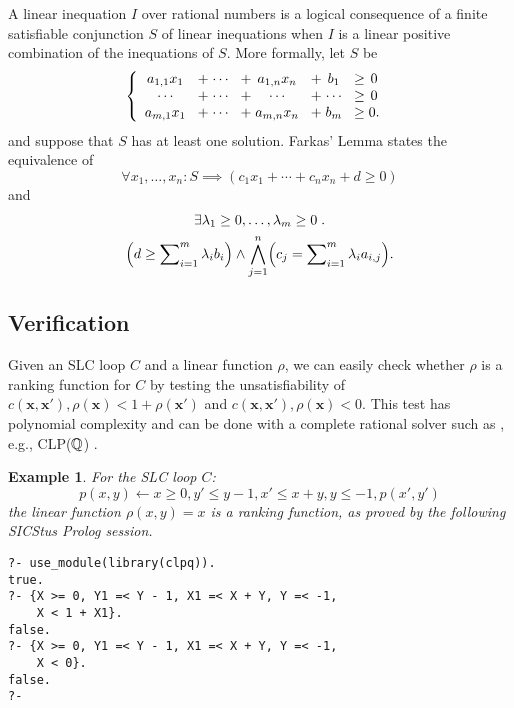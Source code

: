 \documentclass{acm_proc_article-sp}
\newcommand*{\bigland}{\mathop{\bigwedge}}
\newtheorem{example}[theorem]{Example}
\newcommand{\st}{\mathrel{.}}
\newcommand{\itc}{\mathrel{:}}
\begin{document}
A linear inequation $I$ over rational numbers is a logical consequence
of a finite satisfiable conjunction $S$ of linear inequations when
$I$ is a linear positive combination of the inequations of $S$.
More formally, let $S$ be
\[
  \left\{
    \begin{array}{c@{\hspace{2ex}}c@{\;}c@{\hspace{2ex}}c@{\;}c@{\hspace{2ex}}c@{\;}c@{\hspace{2ex}}c@{\;}c@{\hspace{2ex}}}
      a_{1,1}x_1 & + & \cdots & + & a_{1,n}x_n & + & b_1    & \ge & 0 \\
      \cdots    & + & \cdots & + & \cdots    & + & \cdots & \ge & 0 \\
      a_{m,1}x_1 & + & \cdots & + & a_{m,n}x_n & + & b_m    & \ge & 0.
    \end{array}
  \right.
\]
and suppose that $S$ has at least one solution.
Farkas' Lemma states the equivalence of
\[
  \forall x_1, \dots, x_n
    \itc S \implies (c_1 x_1 + \cdots + c_n x_n + d \ge 0 )
\]
and
\begin{multline*}
  \exists \lambda_1 \ge 0, \ldots, \lambda_m \ge 0
    \st \\
      \Bigl( d \ge \sum\nolimits_{i=1}^m \lambda_i b_i \Bigr)
      \land
      \bigland_{j=1}^n
        \Bigl( c_j = \sum\nolimits_{i=1}^m \lambda_i a_{i,j} \Bigr).
\end{multline*}


\subsection{Verification}
\label{sec:lrf-verification}

Given an SLC loop $C$ and a linear function $\rho$,
we can easily check whether $\rho$ is a ranking function for $C$
by testing the unsatisfiability of
$c(\mathbf{x}, \mathbf{x}'), \rho(\mathbf{x}) <  1 +  \rho(\mathbf{x}')$ and
$c(\mathbf{x}, \mathbf{x}'), \rho(\mathbf{x}) < 0$.
This test has polynomial complexity and can be done with a complete
rational solver such as , e.g., CLP($\mathbb{Q}$) \cite{Holzbaur95}.

\begin{example}
\label{ex:linear-ranking-function}
For the SLC loop $C$:
\[
   p(x, y) \leftarrow x \ge 0, y' \le y - 1, x' \le x + y, y \le -1, p(x', y')
\]
the linear function $\rho(x, y) = x$ is a ranking function, as proved by
the following \emph{SICStus Prolog} session.
\begin{verbatim}
?- use_module(library(clpq)).
true.
?- {X >= 0, Y1 =< Y - 1, X1 =< X + Y, Y =< -1,
    X < 1 + X1}.
false.
?- {X >= 0, Y1 =< Y - 1, X1 =< X + Y, Y =< -1,
    X < 0}.
false.
?-
\end{verbatim}
\end{example}
\end{document}
